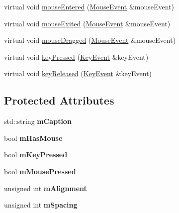 \begin{DoxyCompactItemize}
\item 
virtual void \hyperlink{classgcn_1_1Button_a92a5874befc40b262207a21af20ba128}{mouse\+Entered} (\hyperlink{classgcn_1_1MouseEvent}{Mouse\+Event} \&mouse\+Event)
\item 
virtual void \hyperlink{classgcn_1_1Button_aeca3e20be574004eb22894d1d520a8e1}{mouse\+Exited} (\hyperlink{classgcn_1_1MouseEvent}{Mouse\+Event} \&mouse\+Event)
\item 
virtual void \hyperlink{classgcn_1_1Button_a2e938791d6c856d3b1835fc7a579690a}{mouse\+Dragged} (\hyperlink{classgcn_1_1MouseEvent}{Mouse\+Event} \&mouse\+Event)
\item 
virtual void \hyperlink{classgcn_1_1Button_a187855ce592e907e7b2e148ee4972c62}{key\+Pressed} (\hyperlink{classgcn_1_1KeyEvent}{Key\+Event} \&key\+Event)
\item 
virtual void \hyperlink{classgcn_1_1Button_a84a8355acfd340b6c0d189c6951fc8a5}{key\+Released} (\hyperlink{classgcn_1_1KeyEvent}{Key\+Event} \&key\+Event)
\end{DoxyCompactItemize}
\subsection*{Protected Attributes}
\begin{DoxyCompactItemize}
\item 
std\+::string {\bfseries m\+Caption}\hypertarget{classgcn_1_1Button_afa08738c837be849a98a375cfe09e8e1}{}\label{classgcn_1_1Button_afa08738c837be849a98a375cfe09e8e1}

\item 
bool {\bfseries m\+Has\+Mouse}\hypertarget{classgcn_1_1Button_a7533c90be7d71a4e3839b47f0463a787}{}\label{classgcn_1_1Button_a7533c90be7d71a4e3839b47f0463a787}

\item 
bool {\bfseries m\+Key\+Pressed}\hypertarget{classgcn_1_1Button_a54b4f3d1932a55d04b7e3c08857b529a}{}\label{classgcn_1_1Button_a54b4f3d1932a55d04b7e3c08857b529a}

\item 
bool {\bfseries m\+Mouse\+Pressed}\hypertarget{classgcn_1_1Button_a61abf0e4767c641923ad55fa869bbaae}{}\label{classgcn_1_1Button_a61abf0e4767c641923ad55fa869bbaae}

\item 
unsigned int {\bfseries m\+Alignment}\hypertarget{classgcn_1_1Button_ac31f520dfc7a3f72cf4f51c95ba4553f}{}\label{classgcn_1_1Button_ac31f520dfc7a3f72cf4f51c95ba4553f}

\item 
unsigned int {\bfseries m\+Spacing}\hypertarget{classgcn_1_1Button_a23c252a33155ea383334b564db7a9da5}{}\label{classgcn_1_1Button_a23c252a33155ea383334b564db7a9da5}

\end{DoxyCompactItemize}
